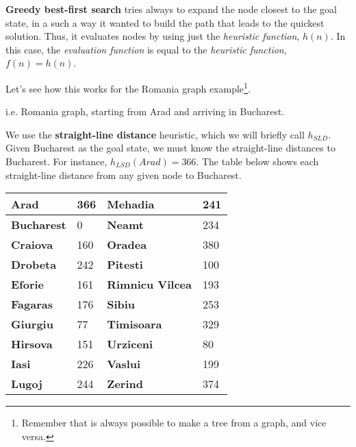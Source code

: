 \textbf{Greedy best-first search} tries always to expand the node closest to the goal state, in a such a way it wanted to build the path that leads to the quickest solution. Thus,
it evaluates nodes by using just the \textit{heuristic function}, $h(n)$. In this case, the \textit{evaluation function} is equal to the \textit{heuristic function}, $f(n) = h(n)$. \vspace{3.5pt}

Let's see how this works for the Romania graph example\footnote{Remember that is always possible to make a tree from a graph, and vice versa.}.
\begin{example}
    i.e. Romania graph, starting from Arad and arriving in Bucharest.
    \begin{center}
    \end{center}
    We use the \textbf{straight-line distance} heuristic, which we will briefly call $h_{SLD}$. Given Bucharest as the goal state, we must know the straight-line 
    distances to Bucharest. For instance,
    $h_{LSD}(Arad) = 366$. The table below shows each straight-line distance from any given node to Bucharest. \vspace{3.5pt}

    \begin{center}
        \begin{tabular}{|l|p{2cm}|l|p{2cm}|}
            \hline
            \bf Arad & 366 & \bf Mehadia & 241 \\
            \hline
            \bf Bucharest & 0 & \bf Neamt & 234 \\
            \hline
            \bf Craiova & 160 & \bf Oradea & 380 \\
            \hline
            \bf Drobeta & 242 & \bf Pitesti & 100 \\
            \hline
            \bf Eforie & 161 & \bf Rimnicu Vilcea & 193 \\
            \hline
            \bf Fagaras & 176 & \bf Sibiu & 253 \\
            \hline
            \bf Giurgiu & 77 & \bf Timisoara & 329 \\
            \hline
            \bf Hirsova & 151 & \bf Urziceni & 80 \\
            \hline
            \bf Iasi & 226 & \bf Vaslui & 199 \\
            \hline
            \bf Lugoj & 244 & \bf Zerind & 374 \\
            \hline
        \end{tabular}
    \end{center} \vspace{3.5pt}


\end{example}
